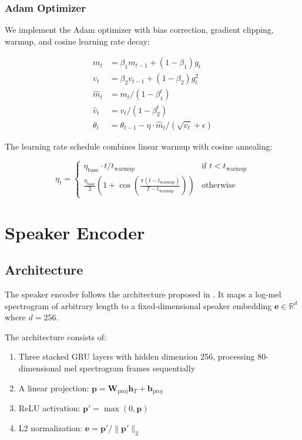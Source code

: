 \documentclass[conference]{IEEEtran}
\begin{document}
\subsubsection{Adam Optimizer}

We implement the Adam optimizer \cite{kingma2014adam} with bias correction, gradient clipping, warmup, and cosine learning rate decay:

\begin{align}
m_t &= \beta_1 m_{t-1} + (1 - \beta_1) g_t \\
v_t &= \beta_2 v_{t-1} + (1 - \beta_2) g_t^2 \\
\hat{m}_t &= m_t / (1 - \beta_1^t) \\
\hat{v}_t &= v_t / (1 - \beta_2^t) \\
\theta_t &= \theta_{t-1} - \eta \cdot \hat{m}_t / (\sqrt{\hat{v}_t} + \epsilon)
\end{align}

The learning rate schedule combines linear warmup with cosine annealing:

\begin{equation}
\eta_t = \begin{cases}
\eta_{\text{base}} \cdot t / t_{\text{warmup}} & \text{if } t < t_{\text{warmup}} \\
\frac{\eta_{\text{base}}}{2}\left(1 + \cos\left(\frac{\pi(t - t_{\text{warmup}})}{T - t_{\text{warmup}}}\right)\right) & \text{otherwise}
\end{cases}
\end{equation}

\section{Speaker Encoder}

\subsection{Architecture}

The speaker encoder follows the architecture proposed in \cite{wan2018generalized, jia2018transfer}. It maps a log-mel spectrogram of arbitrary length to a fixed-dimensional speaker embedding $\mathbf{e} \in \mathbb{R}^{d}$ where $d = 256$.

The architecture consists of:
\begin{enumerate}
\item Three stacked GRU layers with hidden dimension 256, processing 80-dimensional mel spectrogram frames sequentially
\item A linear projection: $\mathbf{p} = \mathbf{W}_{\text{proj}} \mathbf{h}_T + \mathbf{b}_{\text{proj}}$
\item ReLU activation: $\mathbf{p}' = \max(0, \mathbf{p})$
\item L2 normalization: $\mathbf{e} = \mathbf{p}' / \|\mathbf{p}'\|_2$
\end{enumerate}
\end{document}
